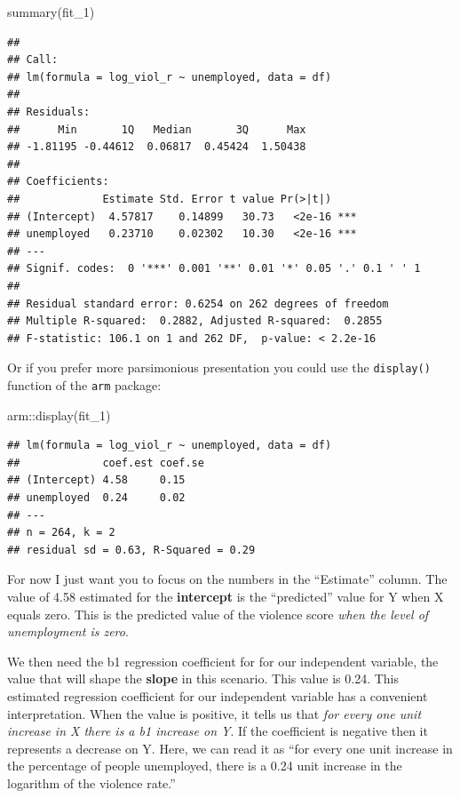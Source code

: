 \documentclass[
]{book}
\newenvironment{Shaded}{\begin{snugshade}}{\end{snugshade}}
\newcommand{\FunctionTok}[1]{\textcolor[rgb]{0.00,0.00,0.00}{#1}}
\newcommand{\NormalTok}[1]{#1}
\newcommand{\SpecialCharTok}[1]{\textcolor[rgb]{0.00,0.00,0.00}{#1}}
\begin{document}
\begin{Shaded}
\begin{Highlighting}[]
\FunctionTok{summary}\NormalTok{(fit\_1)}
\end{Highlighting}
\end{Shaded}

\begin{verbatim}
## 
## Call:
## lm(formula = log_viol_r ~ unemployed, data = df)
## 
## Residuals:
##      Min       1Q   Median       3Q      Max 
## -1.81195 -0.44612  0.06817  0.45424  1.50438 
## 
## Coefficients:
##             Estimate Std. Error t value Pr(>|t|)    
## (Intercept)  4.57817    0.14899   30.73   <2e-16 ***
## unemployed   0.23710    0.02302   10.30   <2e-16 ***
## ---
## Signif. codes:  0 '***' 0.001 '**' 0.01 '*' 0.05 '.' 0.1 ' ' 1
## 
## Residual standard error: 0.6254 on 262 degrees of freedom
## Multiple R-squared:  0.2882, Adjusted R-squared:  0.2855 
## F-statistic: 106.1 on 1 and 262 DF,  p-value: < 2.2e-16
\end{verbatim}

Or if you prefer more parsimonious presentation you could use the \texttt{display()} function of the \texttt{arm} package:

\begin{Shaded}
\begin{Highlighting}[]
\NormalTok{arm}\SpecialCharTok{::}\FunctionTok{display}\NormalTok{(fit\_1)}
\end{Highlighting}
\end{Shaded}

\begin{verbatim}
## lm(formula = log_viol_r ~ unemployed, data = df)
##             coef.est coef.se
## (Intercept) 4.58     0.15   
## unemployed  0.24     0.02   
## ---
## n = 264, k = 2
## residual sd = 0.63, R-Squared = 0.29
\end{verbatim}

For now I just want you to focus on the numbers in the ``Estimate'' column. The value of 4.58 estimated for the \textbf{intercept} is the ``predicted'' value for Y when X equals zero. This is the predicted value of the violence score \emph{when the level of unemployment is zero}.

We then need the b1 regression coefficient for for our independent variable, the value that will shape the \textbf{slope} in this scenario. This value is 0.24. This estimated regression coefficient for our independent variable has a convenient interpretation. When the value is positive, it tells us that \emph{for every one unit increase in X there is a b1 increase on Y}. If the coefficient is negative then it represents a decrease on Y. Here, we can read it as ``for every one unit increase in the percentage of people unemployed, there is a 0.24 unit increase in the logarithm of the violence rate.''
\end{document}
